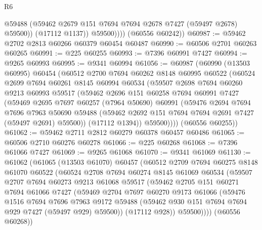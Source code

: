 \begin{lexlean}{R6}
\begin{coremodule}
                  @59488
                  (@59462 @2679 @151 @7694 @7694 @2678 @7427 (@59497 @2678) @59500))
                (@17112 @1137))
              @59500))))
      (@60556 @60242))
@60987 := @59462 @2702 @2813 @60266 @60379 @60454 @60487
@60990 := @60506 @2701 @60263 @60265
@60991 := @225 @60255
@60993 := @7396 @60991 @7427
@60994 := @9265 @60993
@60995 := @9341 @60994
@61056 := @60987
    (@60990
      (@13503 @60995)
      @60454
      (@60512
        @2700
        @7694
        @60262
        @8148
        @60995
        @60522
        (@60524
          @2699
          @7694
          @60261
          @8145
          @60994
          @60534
          (@59507
            @2698
            @7694
            @60260
            @9213
            @60993
            @59517
            (@59462
              @2696
              @151
              @60258
              @7694
              @60991
              @7427
              (@59469
                @2695
                @7697
                @60257
                (@7964 @50690)
                @60991
                (@59476
                  @2694
                  @7694
                  @7696
                  @7963
                  @50690
                  @59488
                  (@59462 @2692 @151 @7694 @7694 @2691 @7427 (@59497 @2691) @59500))
                (@17112 @1394))
              @59500))))
      (@60556 @60255))
@61062 := @59462 @2711 @2812 @60279 @60378 @60457 @60486
@61065 := @60506 @2710 @60276 @60278
@61066 := @225 @60268
@61068 := @7396 @61066 @7427
@61069 := @9265 @61068
@61070 := @9341 @61069
@61130 := @61062
    (@61065
      (@13503 @61070)
      @60457
      (@60512
        @2709
        @7694
        @60275
        @8148
        @61070
        @60522
        (@60524
          @2708
          @7694
          @60274
          @8145
          @61069
          @60534
          (@59507
            @2707
            @7694
            @60273
            @9213
            @61068
            @59517
            (@59462
              @2705
              @151
              @60271
              @7694
              @61066
              @7427
              (@59469
                @2704
                @7697
                @60270
                @9173
                @61066
                (@59476
                  @1516
                  @7694
                  @7696
                  @7963
                  @9172
                  @59488
                  (@59462 @930 @151 @7694 @7694 @929 @7427 (@59497 @929) @59500))
                (@17112 @928))
              @59500))))
      (@60556 @60268))

\end{coremodule}
\end{lexlean}
